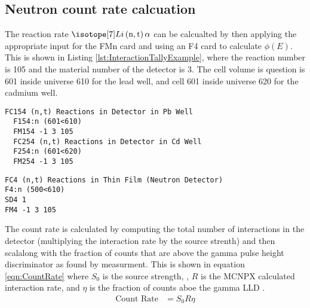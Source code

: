 \documentclass[draftcls,onecolumn]{IEEEtran}
\begin{document}
\subsection{Neutron count rate calcuation}
The reaction rate $\iso[7]{Li}\left(\text{n},\text{t}\right)\alpha$ can be calcualted by then applying the appropriate input for the FMn card and using an F4 card to calculate $\phi(E)$.
This is shown in Listing \ref{lst:InteractionTallyExample}, where the reaction number is 105 and the material number of the detector is 3.
The cell volume is question is 601 inside universe 610 for the lead well, and cell 601 inside universe 620 for the cadmium well.
\begin{lstlisting}[caption={[Lead and Cadmium Well ${}^{6}\text{Li}\left(\text{n},\text{t}\right)\alpha$ Reaction Rate]Lead and Cadmium Well ${}^{6}\text{Li}\left(\text{n},\text{t}\right)\alpha$ Reaction Rates. The lead well is 154, and the cadmium well is 254},label={lst:InteractionTallyExample}]
  FC154 (n,t) Reactions in Detector in Pb Well
  F154:n (601<610)
  FM154 -1 3 105
  FC254 (n,t) Reactions in Detector in Cd Well
  F254:n (601<620)
  FM254 -1 3 105
\end{lstlisting}


\begin{lstlisting}[caption={[RPM8 ${}^{6}\text{Li}\left(\text{n},\text{t}\right)\alpha$ Reaction Rate]RPM8 ${}^{6}\text{Li}\left(\text{n},\text{t}\right)\alpha$ Reaction Rate. The detector is all of the layers of cell 500 inside universe 610. This tally is multiplied by an SD card to normalize by the volume},label={lst:InteractionRateRMP}]
FC4 (n,t) Reactions in Thin Film (Neutron Detector)
F4:n (500<610)
SD4 1
FM4 -1 3 105
\end{lstlisting}

The count rate is calculated by computing the total number of interactions in the detector (multiplying the interaction rate by the source strenth) and then scalalong with the fraction of counts that are above the gamma pulse height discriminator as found by measurment.
This is shown in equation \eqref{eqn:CountRate} where $S_0$ is the source strength, , $R$ is the MCNPX calculated interaction rate, and $\eta$ is the fraction of counts aboe the gamma LLD .
\begin{align}
 \label{eqn:CountRate}
 \text{Count Rate} &= S_0 R \eta
\end{align}

\pagebreak
\end{document}
